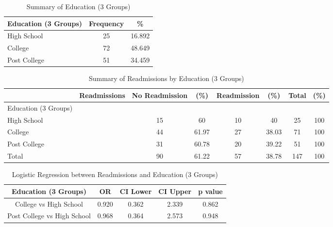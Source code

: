 \documentclass[12pt,]{article}
\begin{document}
\begin{table}[!h]

\caption{\label{tab:unnamed-chunk-9}Summary of Education (3 Groups)}
\centering
\begin{tabular}{>{\centering\arraybackslash}p{5cm}cc}
\toprule
Education (3 Groups) & Frequency & \%\\
\midrule
High School & 25 & 16.892\\
\rowcolor[HTML]{E3E5E7}  College & 72 & 48.649\\
Post College & 51 & 34.459\\
\bottomrule
\end{tabular}
\end{table}

\begin{table}[!h]

\caption{\label{tab:unnamed-chunk-9}Summary of Readmissions by Education (3 Groups)}
\centering
\begin{tabular}{>{\centering\arraybackslash}p{5cm}ccccccc}
\toprule
  & Readmissions & No Readmission & (\%) & Readmission & (\%) & Total & (\%)\\
\midrule
Education (3 Groups) &  &  &  &  &  &  & \\
\rowcolor[HTML]{E3E5E7}  High School &  & 15 & 60 & 10 & 40 & 25 & 100\\
College &  & 44 & 61.97 & 27 & 38.03 & 71 & 100\\
\rowcolor[HTML]{E3E5E7}  Post College &  & 31 & 60.78 & 20 & 39.22 & 51 & 100\\
Total &  & 90 & 61.22 & 57 & 38.78 & 147 & 100\\
\bottomrule
\end{tabular}
\end{table}

\pagebreak

\begin{table}[!h]

\caption{\label{tab:unnamed-chunk-10}Logistic Regression between Readmissions and Education (3 Groups)}
\centering
\begin{tabular}{ccccc}
\toprule
Education (3 Groups) & OR & CI Lower & CI Upper & p value\\
\midrule
College vs High School & 0.920 & 0.362 & 2.339 & 0.862\\
\rowcolor[HTML]{E3E5E7}  Post College vs High School & 0.968 & 0.364 & 2.573 & 0.948\\
\bottomrule
\end{tabular}
\end{table}
\end{document}
